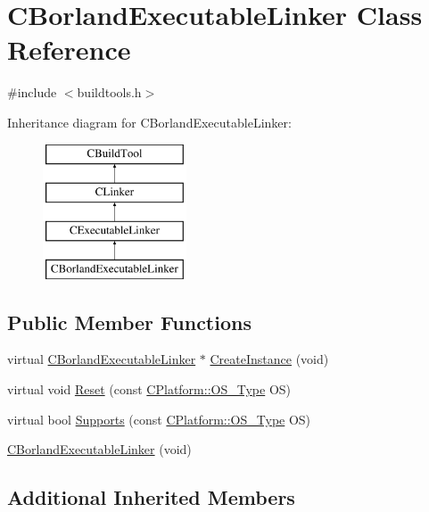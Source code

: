 \hypertarget{classCBorlandExecutableLinker}{\section{C\-Borland\-Executable\-Linker Class Reference}
\label{classCBorlandExecutableLinker}
}


{\ttfamily \#include $<$buildtools.\-h$>$}

Inheritance diagram for C\-Borland\-Executable\-Linker\-:\begin{figure}[H]
\begin{center}
\leavevmode
\includegraphics[height=4.000000cm]{d1/d9f/classCBorlandExecutableLinker}
\end{center}
\end{figure}
\subsection*{Public Member Functions}
\begin{DoxyCompactItemize}
\item 
virtual \hyperlink{classCBorlandExecutableLinker}{C\-Borland\-Executable\-Linker} $\ast$ \hyperlink{classCBorlandExecutableLinker_ab4acecd477ed0458760a3f14ee6fb868}{Create\-Instance} (void)
\item 
virtual void \hyperlink{classCBorlandExecutableLinker_a90ea600853600bac560530248a4a82b4}{Reset} (const \hyperlink{classCPlatform_a2fb735c63c53052f79629e338bb0f535}{C\-Platform\-::\-O\-S\-\_\-\-Type} O\-S)
\item 
virtual bool \hyperlink{classCBorlandExecutableLinker_a9786f43fd6a38bdb00fc043f069f840a}{Supports} (const \hyperlink{classCPlatform_a2fb735c63c53052f79629e338bb0f535}{C\-Platform\-::\-O\-S\-\_\-\-Type} O\-S)
\item 
\hyperlink{classCBorlandExecutableLinker_a134110e4801c569b5537670e99b9d760}{C\-Borland\-Executable\-Linker} (void)
\end{DoxyCompactItemize}
\subsection*{Additional Inherited Members}


